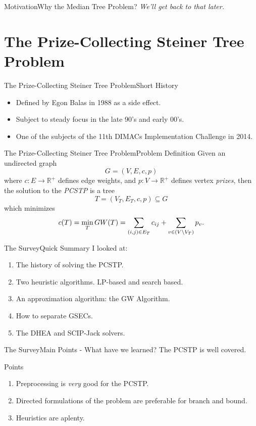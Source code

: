 \documentclass[rgb,dvipsnames]{beamer}
\newcommand{\RR}{\mathbb{R}}      %
\begin{document}
\begin{frame}{Motivation}{Why the Median Tree Problem?}
  \pause
  \textit{We'll get back to that later.}
\end{frame}
\section{The Prize-Collecting Steiner Tree Problem}
\begin{frame}{The Prize-Collecting Steiner Tree Problem}{Short History}
  \begin{itemize}
  \item Defined by Egon Balas in 1988 as a side effect.
  \item Subject to steady focus in the late 90's and early 00's.
  \item One of the subjects of the 11th DIMACs Implementation Challenge in 2014.
  \end{itemize}
\end{frame}
\begin{frame}{The Prize-Collecting Steiner Tree Problem}{Problem Definition}
 Given an undirected graph
\[G = (V, E, c, p)\]
where $c: E \to \RR^+$ defines edge weights,
and $p: V \to \RR^+$ defines vertex \textit{prizes}, then the solution to the
\textit{PCSTP} is a tree
\[T = (V_T, E_T, c, p) \subseteq G\]
which minimizes
\[c(T) = \min_T GW(T) = \sum_{(i,j) \in E_T} c_{ij} + \sum_{v\in (V \setminus V_T)} p_v \textnormal{.} \]
\end{frame}

\begin{frame}{The Survey}{Quick Summary}
  I looked at:
  \begin{enumerate}
  \item The history of solving the PCSTP.
  \item Two heuristic algorithms. LP-based and search based.
  \item An approximation algorithm: the GW Algorithm.
  \item How to separate GSECs.
  \item The DHEA and SCIP-Jack solvers.
  \end{enumerate}
\end{frame}

\begin{frame}{The Survey}{Main Points - What have we learned?}
  The PCSTP is well covered.

  \begin{block}{Points}
  \begin{enumerate}
  \item Preprocessing is \textit{very} good for the PCSTP. \pause
  \item Directed formulations of the problem are preferable for
    branch and bound. \pause
  \item Heuristics are aplenty.
  \end{enumerate}
  \end{block}

\end{frame}
\end{document}
